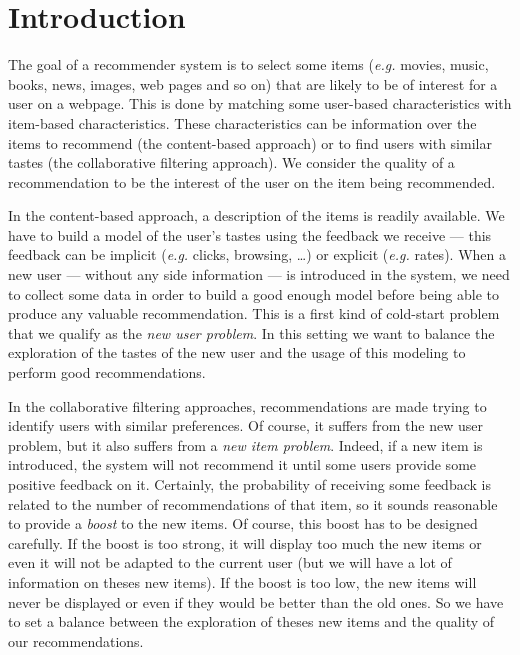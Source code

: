 \documentclass[twoside,leqno,twocolumn]{article}
\newcommand{\pp}[1]{\color{red}(pp) #1\color{black}}
\newcommand{\jm}[1]{{\color{TealBlue}(jm) #1\color{black}}}
\newcommand{\eg}{\textit{e.g.}}
\begin{document}
\section{Introduction}
The goal of a recommender system is to select some items (\eg{} movies,
music, books, news, images, web pages and so on) that are likely to be
of interest for a user on a webpage. This is done by matching some
user-based characteristics with item-based characteristics. These
characteristics can be information over the items to recommend (the
content-based approach) or to find users with similar tastes (the
collaborative filtering approach). 
   We consider the quality
of a recommendation to be the interest of the user on the item being
recommended.

In the content-based approach, a description of the items is readily
available. We have to build a model of the user's tastes using the
feedback we receive --- this feedback can be implicit (\eg{} clicks,
browsing, \ldots) or explicit (\eg{} rates). When a new user ---
without any side information --- is introduced in the system, we need
to collect some data in order to build a good enough model before
being able to produce any valuable recommendation. This is a first
kind of cold-start problem that we qualify as the \emph{new user
  problem}. In this setting we want to balance the exploration of the tastes of the new user and the usage of this modeling to perform good recommendations.  

In the collaborative filtering approaches, recommendations are made
trying to identify users with similar preferences. Of course, it
suffers from the new user problem, but it also suffers from a
\emph{new item problem}. Indeed, if a new item is introduced, the
system will not recommend it until some users provide some positive
feedback on it. Certainly, the probability of receiving some feedback
is related to the number of recommendations of that item, so it sounds
reasonable to provide a \emph{boost} to the new items. Of course, this
boost has to be designed carefully. If the boost is too strong, it will display too much the new items or even it will not be adapted to the current user (but we will have a lot of information on theses new items). If the boost is too low, the new items will never be displayed or even if they would be better than the old ones. So we  have to set a balance between the exploration of theses new items and the quality of our recommendations. 
\end{document}
